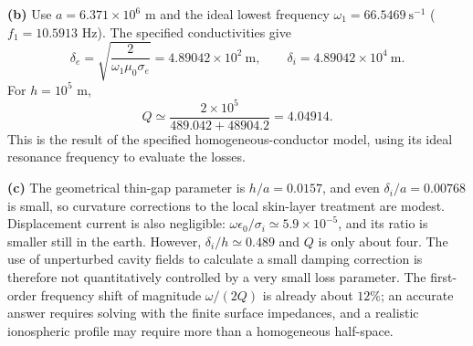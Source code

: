 \textbf{(b)} Use $a=6.371\times10^6$ m and the ideal lowest
frequency $\omega_1=66.5469\ \mathrm{s^{-1}}$
($f_1=10.5913$ Hz).  The specified conductivities give
\[
\delta_e=\sqrt{\frac2{\omega_1\mu_0\sigma_e}}
=4.89042\times10^2\ \mathrm{m},\qquad
\delta_i=4.89042\times10^4\ \mathrm{m}.
\]
For $h=10^5$ m,
\[
\boxed{Q\simeq\frac{2\times10^5}{489.042+48904.2}=4.04914.}
\]
This is the result of the specified homogeneous-conductor model,
using its ideal resonance frequency to evaluate the losses.

\textbf{(c)} The geometrical thin-gap parameter is $h/a=0.0157$,
and even $\delta_i/a=0.00768$ is small, so curvature corrections to
the local skin-layer treatment are modest.  Displacement current is
also negligible: $\omega\epsilon_0/\sigma_i\simeq5.9\times10^{-5}$,
and its ratio is smaller still in the earth.  However,
$\delta_i/h\simeq0.489$ and $Q$ is only about four.  The use of
unperturbed cavity fields to calculate a small damping correction is
therefore not quantitatively controlled by a very small loss
parameter.  The first-order frequency shift of magnitude
$\omega/(2Q)$ is already about $12\%$; an accurate answer requires
solving with the finite surface impedances, and a realistic
ionospheric profile may require more than a homogeneous half-space.

